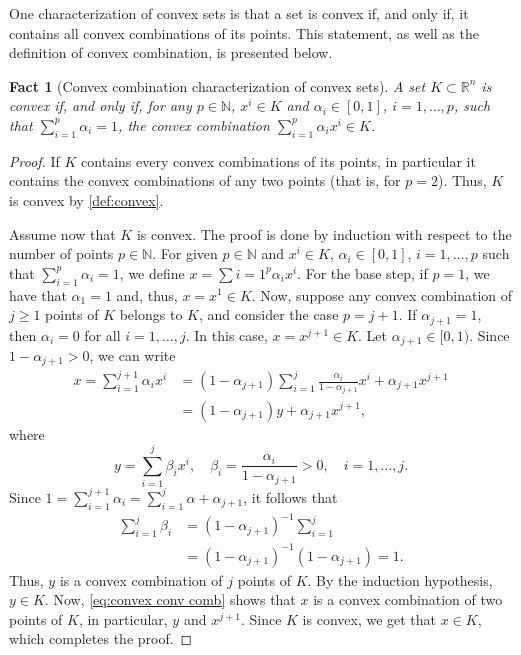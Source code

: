 \documentclass[smallextended,numbook,nospthms]{svjour3}
\theoremstyle{plain}
\newtheorem{fact}[theorem]{Fact}
\theoremstyle{definition}
\def\RR{\mathds R}
\def\NN{\mathds N}
\begin{document}
One characterization of convex sets is that a set is convex if, and only if, it contains all convex combinations of its points. This statement, as well as the definition of convex combination, is presented below.
\begin{fact}[Convex combination characterization of convex sets]\label{fact:convex conv comb}
	A set $K \subset \RR^n$ is convex if, and only if, for any $p \in \NN$, $x^{i} \in K$ and $\alpha_{i} \in [0,1]$, $i=1,\ldots,p$, such that $\sum_{i=1}^{p}\alpha_{i}=1$, the \emph{convex combination} $\sum_{i=1}^{p} \alpha_{i}x^{i} \in K$.
\end{fact}
\begin{proof}
	If $K$ contains every convex combinations of its points, in particular it contains the convex combinations of any two points (that is, for $p=2$). Thus, $K$ is convex by \cref{def:convex}.
	
	Assume now that $K$ is convex. The proof is done by induction with respect to the number of points $p \in \NN$. For given $p \in \NN$ and $x^{i} \in K$, $\alpha_{i} \in [0,1]$, $i=1,\ldots,p$ such that $\sum_{i=1}^{p} \alpha_{i}=1$, we define $x=\sum{i=1}^{p} \alpha_{i}x^{i}$.
	For the base step, if $p=1$, we have that $\alpha_{1}=1$ and, thus, $x=x^{1} \in K$.
	Now, suppose any convex combination of $j \geq 1$ points of $K$ belongs to $K$, and consider the case $p=j+1$.
	If $\alpha_{j+1}=1$, then $\alpha_{i}=0$ for all $i=1,\ldots,j$. In this case, $x=x^{j+1} \in K$.
	Let $\alpha_{j+1} \in [0,1)$. Since $1-\alpha_{j+1}>0$, we can write
	\begin{align}
		x = \sum_{i=1}^{j+1} \alpha_{i}x^{i} &= (1-\alpha_{j+1})\sum_{i=1}^{j} \frac{\alpha_{i}}{1-\alpha_{j+1}}x^{i} + \alpha_{j+1}x^{j+1} \\
		  &= (1-\alpha_{j+1})y + \alpha_{j+1}x^{j+1}, \label{eq:convex conv comb}
	\end{align}
	where
	\[
	y=\sum_{i=1}^{j}\beta_{i}x^{i}, \quad \beta_{i}=\frac{\alpha_{i}}{1-\alpha_{j+1}}>0, \quad i=1,\ldots,j.
	\]
	Since $1=\sum_{i=1}^{j+1}\alpha_{i}=\sum_{i=1}^{j}\alpha + \alpha_{j+1}$, it follows that
	\begin{align}
		\sum_{i=1}^{j} \beta_{i} &= \left(1-\alpha_{j+1}\right)^{-1}\sum_{i=1}^{j} \\
			&= \left(1-\alpha_{j+1}\right)^{-1}\left(1-\alpha_{j+1}\right)=1.
	\end{align}
	Thus, $y$ is a convex combination of $j$ points of $K$. By the induction hypothesis, $y \in K$. Now, \cref{eq:convex conv comb} shows that $x$ is a convex combination of two points of $K$, in particular, $y$ and $x^{j+1}$. Since $K$ is convex, we get that $x \in K$, which completes the proof.
\end{proof}
\end{document}
